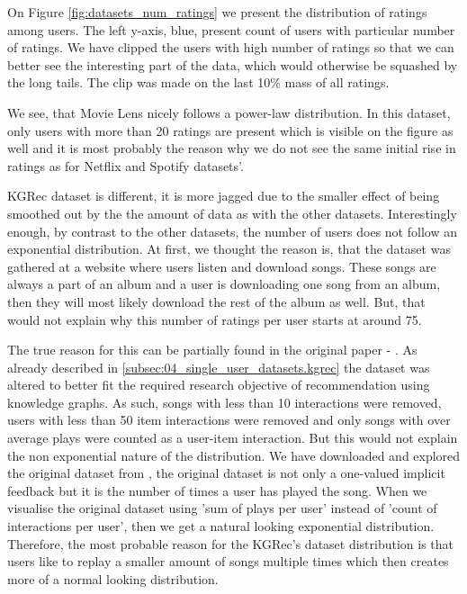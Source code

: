 On Figure \ref{fig:datasets_num_ratings} we present the distribution of ratings among users. The left y-axis, blue, present count of users with particular number of ratings. We have clipped the users with high number of ratings so that we can better see the interesting part of the data, which would otherwise be squashed by the long tails. The clip was made on the last 10\% mass of all ratings.

We see, that Movie Lens nicely follows a power-law distribution. In this dataset, only users with more than 20 ratings are present which is visible on the figure as well and it is most probably the reason why we do not see the same initial rise in ratings as for Netflix and Spotify datasets'.

KGRec dataset is different, it is more jagged due to the smaller effect of being smoothed out by the the amount of data as with the other datasets. Interestingly enough, by contrast to the other datasets, the number of users does not follow an exponential distribution. At first, we thought the reason is, that the dataset was gathered at a website where users listen and download songs. These songs are always a part of an album and a user is downloading one song from an album, then they will most likely download the rest of the album as well. But, that would not explain why this number of ratings per user starts at around 75.

The true reason for this can be partially found in the original paper - \cite{kgrec_dataset_origin}. As already described in \ref{subsec:04_single_user_datasets.kgrec} the dataset was altered to better fit the required research objective of recommendation using knowledge graphs. As such, songs with less than 10 interactions were removed, users with less than 50 item interactions were removed and only songs with over average plays were counted as a user-item interaction. But this would not explain the non exponential nature of the distribution. We have downloaded and explored the original dataset from \cite{kgrec_dataset_origin_full}, the original dataset is not only a one-valued implicit feedback but it is the number of times a user has played the song. When we visualise the original dataset using 'sum of plays per user' instead of 'count of interactions per user', then we get a natural looking exponential distribution. Therefore, the most probable reason for the KGRec's dataset distribution is that users like to replay a smaller amount of songs multiple times which then creates more of a normal looking distribution.

